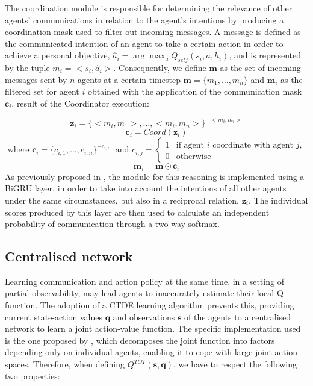 \documentclass[a4paper,singleside,12pt]{report} %
\begin{document}
The coordination module is responsible for determining the relevance of other agents' communications in relation to the agent's intentions by producing a coordination mask used to filter out incoming messages. A message is defined as the communicated intention of an agent to take a certain action in order to achieve a personal objective, $\hat{a}_i=\arg\max_{a}Q_{self}(s_i,a,h_i)$, and is represented by the tuple \(m_i=<s_i,\hat{a}_i>\). Consequently, we define \(\textbf{m}\) as the set of incoming messages sent by \(n\) agents at a certain timestep \(\textbf{m}=\{m_1,\dots,m_n\}\) and \(\bar{\textbf{m}}_i\) as the filtered set for agent \(i\) obtained with the application of the communication mask \(\textbf{c}_i\), result of the Coordinator execution:

  \begin{equation}
    \textbf{z}_i=\{<m_i,m_1>, \dots ,<m_i,m_n>\}^{-<m_i,m_i>}
  \end{equation}
  \begin{equation}\label{eq:comm-mask}
    \textbf{c}_i=Coord(\textbf{z}_i)
  \end{equation}
  $ \text{ where } \textbf{c}_i=\{c_{i,1},\dots,c_{i,n}\}^{-c_{i,i}}$
  $\text{ and } c_{i,j}= 
    \begin{cases}
        1 & \text{if agent } i \text{ coordinate with agent } j,\\
        0 & \text{otherwise}
    \end{cases}$
  \begin{equation}\label{eq:comm-messages}
    \bar{\textbf{m}}_i=\textbf{m} \odot \textbf{c}_i
  \end{equation}
As previously proposed in \cite{ATOCJiang2018LearningAC}, the module for this reasoning is implemented using a BiGRU layer, in order to take into account the intentions of all other agents under the same circumstances, but also in a reciprocal relation, \(\textbf{z}_i\). The individual scores produced by this layer are then used to calculate an independent probability of communication through a two-way softmax.

\subsection{Centralised network}\label{centralised-network}
Learning communication and action policy at the same time, in a setting of partial observability, may lead agents to inaccurately estimate their local Q function. The adoption of a CTDE learning algorithm prevents this, providing current state-action values $\textbf{q}$ and observations $\textbf{s}$ of the agents to a centralised network to learn a joint action-value function. The specific implementation used is the one proposed by \cite{Rashid2018QMIXMV}, which decomposes the joint function into factors depending only on individual agents, enabling it to cope with large joint action spaces. Therefore, when defining \(Q^{TOT}(\textbf{s}, \textbf{q})\), we have to respect the following two properties:
\end{document}
